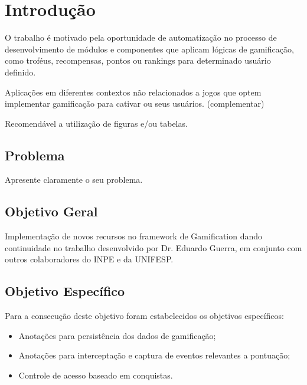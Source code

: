 \chapter[Introdução]{Introdução}
\par O trabalho é motivado pela oportunidade de automatização no processo de desenvolvimento de módulos e componentes que aplicam lógicas de gamificação, como troféus, recompensas, pontos ou rankings para determinado usuário definido.
\par Aplicações em diferentes contextos não relacionados a jogos que optem implementar gamificação para cativar ou seus usuários. (complementar)
\par Recomendável a utilização de figuras e/ou tabelas.

\section{Problema}
\par Apresente claramente o seu problema.

\section{Objetivo Geral}
\par Implementação de novos recursos no framework de Gamification dando continuidade no trabalho desenvolvido por Dr. Eduardo Guerra, em conjunto com outros colaboradores do INPE e da UNIFESP. 

\section{Objetivo Espec\'ifico}
\par Para a consecução deste objetivo foram estabelecidos os objetivos específicos:
\begin{itemize}
    \item Anotações para persistência dos dados de gamificação;
    \item Anotações para interceptação e captura de eventos relevantes a pontuação;
    \item Controle de acesso baseado em conquistas.
\end{itemize}
